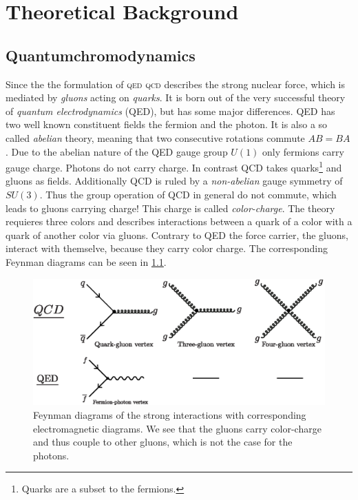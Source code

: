 \documentclass[../../index.tex]{subfiles}
\begin{document}
\chapter{Theoretical Background}

\section{Quantumchromodynamics}
\label{sec:quantumchromodynamics}
Since the the formulation of \textsc{qed}
\textsc{qcd} describes the strong nuclear force, which is mediated by
\textit{gluons} acting on \textit{quarks}. It is born out of the very successful
theory of \textit{quantum electrodynamics} (QED), but has some major
differences. QED has two well known constituent fields the fermion and the
photon. It is also a so called \textit{abelian} theory, meaning that two
consecutive rotations commute $AB = BA$. Due to the abelian nature of the QED
gauge group $U(1)$ only fermions carry gauge charge. Photons do not carry
charge. In contrast QCD takes quarks\footnote{Quarks are a subset to the
  fermions.} and gluons as fields. Additionally QCD is ruled by a
\textit{non-abelian} gauge symmetry of $SU(3)$. Thus the group operation of QCD
in general do not commute, which leads to gluons carrying charge! This charge is
called \textit{color-charge}. The theory requieres three colors and describes
interactions between a quark of a color with a quark of another color via
gluons. Contrary to QED the force carrier, the gluons, interact with themselve,
because they carry color charge. The corresponding Feynman diagrams can be seen
in \cref{fig:qcdFeynmanDiagrams}.
\begin{figure}
  \centering \includegraphics[width=\textwidth]{./images/qcdFeynmanDiagrams.eps}
  \caption{Feynman diagrams of the strong interactions with corresponding
    electromagnetic diagrams. We see that the gluons carry color-charge and thus
    couple to other gluons, which is not the case for the photons.}
  \label{fig:qcdFeynmanDiagrams}
\end{figure}
\end{document}
